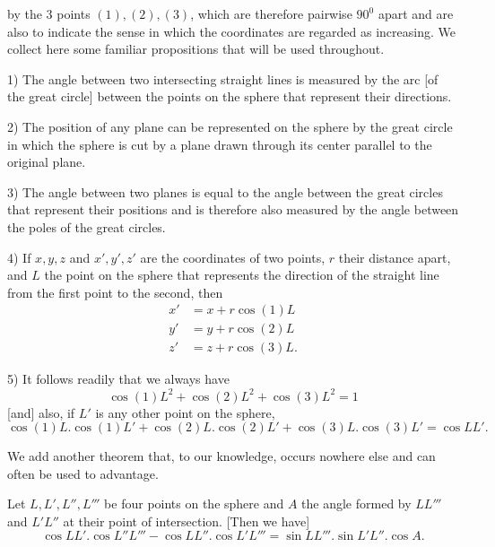 %
by the $3$ points $(1),(2),(3)$, which are therefore pairwise $90^{0}$ apart and are also to indicate the sense in which the coordinates are regarded as increasing. We collect here some familiar propositions that will be used throughout.

1) The angle between two intersecting straight lines is measured by the arc [of the great circle] between the points on the sphere that represent their directions.

2) The position of any plane can be represented on the sphere by the great circle in which the sphere is cut by a plane drawn through its center parallel to the original plane.

3) The angle between two planes is equal to the angle between the great circles that represent their positions and is therefore also measured by the angle between the poles of the great circles.

4) If $x,y,z$ and $x',y',z'$ are the coordinates of two points, $r$ their distance apart, and $L$ the point on the sphere that represents the direction of the straight line from the first point to the second, then
\[
\begin{aligned}
x'&=x+r\cos(1)L\\
y'&=y+r\cos(2)L\\
z'&=z+r\cos(3)L.
\end{aligned}
\]
\par\noindent\hspace*{1.2em}5) It follows readily that we always have
\[
\cos(1)L^{2}+\cos(2)L^{2}+\cos(3)L^{2}=1
\]
[and] also, if $L'$ is any other point on the sphere,
\[
\cos(1)L.\cos(1)L'+\cos(2)L.\cos(2)L'+\cos(3)L.\cos(3)L'=\cos LL'.
\]

We add another theorem that, to our knowledge, occurs nowhere else and can often be used to advantage.

Let $L,L',L'',L'''$ be four points on the sphere and $A$ the angle formed by $LL'''$ and $L'L''$ at their point of intersection. [Then we have]
\[
\cos LL'.\cos L''L'''-\cos LL''.\cos L'L'''=\sin LL'''.\sin L'L''.\cos A.
\]
